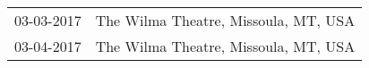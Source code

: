 \begin{supertabular}{ll}
 03-03-2017 &  The Wilma Theatre, Missoula, MT, USA \\
 03-04-2017 &  The Wilma Theatre, Missoula, MT, USA \\
\end{supertabular}
